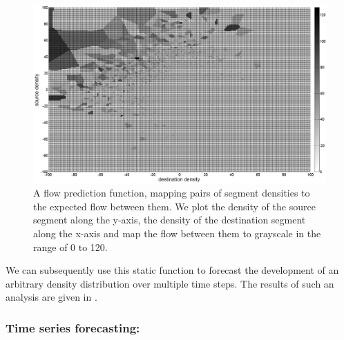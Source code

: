 \documentclass[12pt,a4paper,twoside,openright]{book}
\begin{document}
\begin{figure}
    \centering
    \includegraphics[width=\columnwidth]{img/flow_func}
    \caption[Flow prediction function]{A flow prediction function, mapping pairs of segment densities to the expected flow between them. We plot the density of the source segment along the y-axis, the density of the destination segment along the x-axis and map the flow between them to grayscale in the range of 0 to 120.}
    \label{fig:flow_func}
\end{figure}

We can subsequently use this static function to forecast the development of an arbitrary density distribution over multiple time steps.
%
The results of such an analysis are given in .

\subsubsection{Time series forecasting:}
\label{subsubsec:time-series-forecasting}
\end{document}
